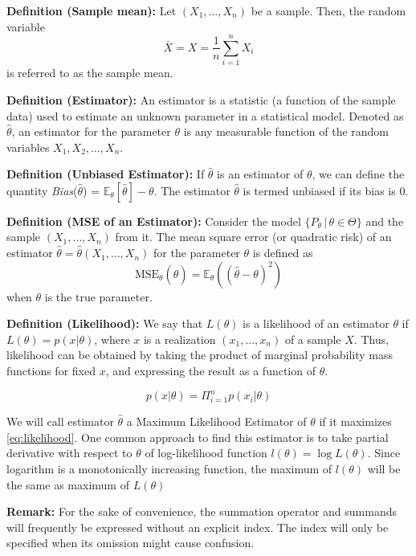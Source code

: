 \documentclass[12pt,a4paper,oneside]{book} %
\begin{document}
\textbf{Definition (Sample mean):} Let $(X_1, \ldots, X_n)$ be a sample. Then, the random variable
\[ \bar{X} = X = \frac{1}{n} \sum_{i=1}^{n} X_i \]
is referred to as the sample mean.

\textbf{Definition (Estimator):} An estimator is a statistic (a function of the sample data) used to estimate an unknown parameter in a statistical model. Denoted as $\hat{\theta}$, an estimator for the parameter $\theta$ is any measurable function of the random variables $X_1, X_2, \ldots, X_n$.

\textbf{Definition (Unbiased Estimator):} If $\hat{\theta}$ is an estimator of $\theta$, we can define the quantity \textit{Bias}($\hat{\theta}$) = $\mathbb{E}_{\theta}[\hat{\theta}] - \theta$. The estimator $\hat{\theta}$ is termed unbiased if its bias is 0.

\textbf{Definition (MSE of an Estimator):} Consider the model $\{P_{\theta} \,|\, \theta \in \Theta\}$ and the sample $(X_1, \ldots, X_n)$ from it. The mean square error (or quadratic risk) of an estimator $\hat{\theta} = \hat{\theta}(X_1, \ldots, X_n)$ for the parameter $\theta$ is defined as
\[ \text{MSE}_{\theta}(\hat{\theta}) = \mathbb{E}_{\theta}((\hat{\theta} - \theta)^2) \]
when $\theta$ is the true parameter.

\textbf{Definition (Likelihood):} We say that $L(\theta)$ is a likelihood of an estimator $\theta$ if $L(\theta)=p(x|\theta)$, where $x$ is a realization $(x_1,...,x_n)$ of a sample $X$. Thus, likelihood can be obtained by taking the product of marginal probability mass functions for fixed $x$, and expressing the result as a function of $\theta$.

\begin{equation} \label{eq:likelihood}
	p(x|\theta) = \Pi^n_{i=1} p(x_i| \theta)
\end{equation}


We will call estimator $\hat{\theta}$ a Maximum Likelihood Estimator of $\theta$ if it maximizes \ref{eq:likelihood}. One common approach to find this estimator is to take partial derivative with respect to $\theta$ of log-likelihood function $l(\theta)=\log L(\theta)$. Since logarithm is a monotonically increasing function, the maximum of $l(\theta)$ will be the same as maximum of $L(\theta)$


\textbf{Remark:} For the sake of convenience, the summation operator and summands will frequently be expressed without an explicit index. The index will only be specified when its omission might cause confusion.
\end{document}
